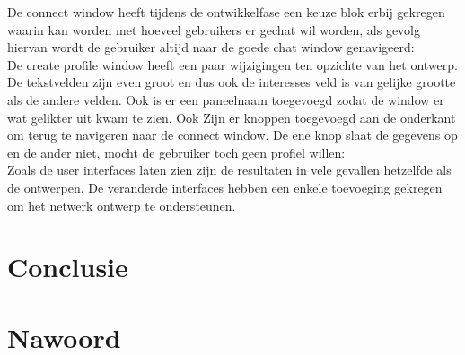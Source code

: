 \documentclass[12pt]{article}
\begin{document}
\noindent De connect window heeft tijdens de ontwikkelfase een keuze blok erbij gekregen waarin kan worden met hoeveel gebruikers er gechat wil worden, als gevolg hiervan wordt de gebruiker altijd naar de goede chat window genavigeerd:
\\

\noindent De create profile window heeft een paar wijzigingen ten opzichte van het ontwerp. De tekstvelden zijn even groot en dus ook de interesses veld is van gelijke grootte als de andere velden. Ook is er een paneelnaam toegevoegd zodat de window er wat gelikter uit kwam te zien. Ook Zijn er knoppen toegevoegd aan de onderkant om terug te navigeren naar de connect window. De ene knop slaat de gegevens op en de ander niet, mocht de gebruiker toch geen profiel willen:
\\

\noindent Zoals de user interfaces laten zien zijn de resultaten in vele gevallen hetzelfde als de ontwerpen. De veranderde interfaces hebben een enkele toevoeging gekregen om het netwerk ontwerp te ondersteunen.
\newpage

\section{Conclusie}

\newpage

\section{Nawoord}

\newpage



\end{document}
